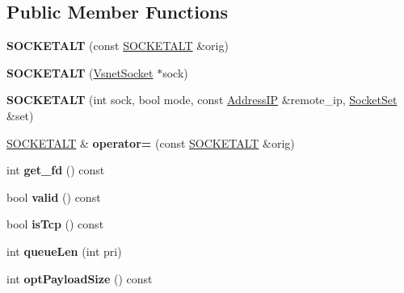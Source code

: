 \subsection*{Public Member Functions}
\begin{DoxyCompactItemize}
\item 
{\bfseries S\+O\+C\+K\+E\+T\+A\+LT} (const \hyperlink{classSOCKETALT}{S\+O\+C\+K\+E\+T\+A\+LT} \&orig)\hypertarget{classSOCKETALT_a4b99c62a277fdc22e00d149488d8974c}{}\label{classSOCKETALT_a4b99c62a277fdc22e00d149488d8974c}

\item 
{\bfseries S\+O\+C\+K\+E\+T\+A\+LT} (\hyperlink{classVsnetSocket}{Vsnet\+Socket} $\ast$sock)\hypertarget{classSOCKETALT_a8b5226c263f82c2c904bee7eb2779096}{}\label{classSOCKETALT_a8b5226c263f82c2c904bee7eb2779096}

\item 
{\bfseries S\+O\+C\+K\+E\+T\+A\+LT} (int sock, bool mode, const \hyperlink{structAddressIP}{Address\+IP} \&remote\+\_\+ip, \hyperlink{classSocketSet}{Socket\+Set} \&set)\hypertarget{classSOCKETALT_a393423f6cedcbc19c43fe10589de49ef}{}\label{classSOCKETALT_a393423f6cedcbc19c43fe10589de49ef}

\item 
\hyperlink{classSOCKETALT}{S\+O\+C\+K\+E\+T\+A\+LT} \& {\bfseries operator=} (const \hyperlink{classSOCKETALT}{S\+O\+C\+K\+E\+T\+A\+LT} \&orig)\hypertarget{classSOCKETALT_aca1b9d7cd5d85bfafdb9bdda819161cf}{}\label{classSOCKETALT_aca1b9d7cd5d85bfafdb9bdda819161cf}

\item 
int {\bfseries get\+\_\+fd} () const \hypertarget{classSOCKETALT_a1772f111ed5b171091dc3c2ea46b0003}{}\label{classSOCKETALT_a1772f111ed5b171091dc3c2ea46b0003}

\item 
bool {\bfseries valid} () const \hypertarget{classSOCKETALT_ac9ea3e0fa7f9e51953f802e690c3936d}{}\label{classSOCKETALT_ac9ea3e0fa7f9e51953f802e690c3936d}

\item 
bool {\bfseries is\+Tcp} () const \hypertarget{classSOCKETALT_a4839a4fa5017186ca5e3e03f546ae0d4}{}\label{classSOCKETALT_a4839a4fa5017186ca5e3e03f546ae0d4}

\item 
int {\bfseries queue\+Len} (int pri)\hypertarget{classSOCKETALT_a10fd844ebd3bb03522b663ac63311dfa}{}\label{classSOCKETALT_a10fd844ebd3bb03522b663ac63311dfa}

\item 
int {\bfseries opt\+Payload\+Size} () const \hypertarget{classSOCKETALT_a4e7cb093b57876d47b3bf11f2842555f}{}\label{classSOCKETALT_a4e7cb093b57876d47b3bf11f2842555f}


\end{DoxyCompactItemize}
